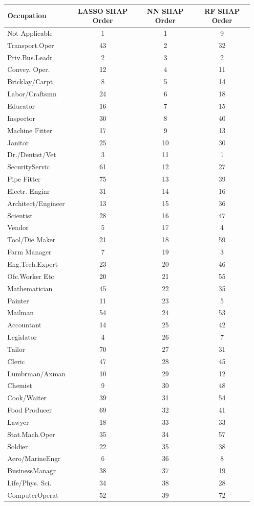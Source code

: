 \begin{tabular}{lccc}
\hline\hline
Occupation & LASSO SHAP Order & NN SHAP Order & RF SHAP Order \\
\hline
Not Applicable&1&1&9\\
Transport.Oper&43&2&32\\
Priv.Bus.Leadr&2&3&2\\
Convey. Oper.&12&4&11\\
Bricklay/Carpt&8&5&14\\
Labor/Craftsmn&24&6&18\\
Educator&16&7&15\\
Inspector&30&8&40\\
Machine Fitter&17&9&13\\
Janitor&25&10&30\\
Dr./Dentist/Vet&3&11&1\\
SecurityServic&61&12&27\\
Pipe Fitter&75&13&39\\
Electr. Enginr&31&14&16\\
Architect/Engineer&13&15&36\\
Scientist&28&16&47\\
Vendor&5&17&4\\
Tool/Die Maker&21&18&59\\
Farm Manager&7&19&3\\
Eng.Tech.Expert&23&20&46\\
Ofc.Worker Etc&20&21&55\\
Mathematician&45&22&35\\
Painter&11&23&5\\
Mailman&54&24&53\\
Accountant&14&25&42\\
Legislator&4&26&7\\
Tailor&70&27&31\\
Cleric&47&28&45\\
Lumbrman/Axman&10&29&12\\
Chemist&9&30&48\\
Cook/Waiter&39&31&54\\
Food Producer&69&32&41\\
Lawyer&18&33&33\\
Stat.Mach.Oper&35&34&57\\
Soldier&22&35&38\\
Aero/MarineEngr&6&36&8\\
BusinessManagr&38&37&19\\
Life/Phys. Sci.&34&38&28\\
ComputerOperat&52&39&72\\

\end{tabular}
